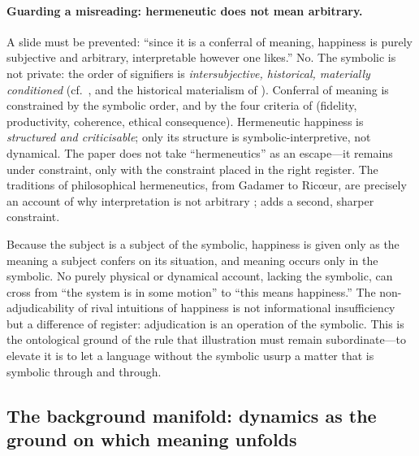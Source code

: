 \paragraph{Guarding a misreading: hermeneutic does not mean arbitrary.} A slide must be prevented: ``since it is a conferral of meaning, happiness is purely subjective and arbitrary, interpretable however one likes.'' No. The symbolic is not private: the order of signifiers is \emph{intersubjective, historical, materially conditioned} (cf.\ , and the historical materialism of ). Conferral of meaning is constrained by the symbolic order, and by the four criteria of  (fidelity, productivity, coherence, ethical consequence). Hermeneutic happiness is \emph{structured and criticisable}; only its structure is symbolic-interpretive, not dynamical. The paper does not take ``hermeneutics'' as an escape---it remains under constraint, only with the constraint placed in the right register. The traditions of philosophical hermeneutics, from Gadamer to Ricœur, are precisely an account of why interpretation is not arbitrary \parencite{gadamer2004,ricoeur1976};  adds a second, sharper constraint.

\begin{claim}
Because the subject is a subject of the symbolic, happiness is given only as the meaning a subject confers on its situation, and meaning occurs only in the symbolic. No purely physical or dynamical account, lacking the symbolic, can cross from ``the system is in some motion'' to ``this means happiness.'' The non-adjudicability of rival intuitions of happiness is not informational insufficiency but a difference of register: adjudication is an operation of the symbolic. This is the ontological ground of the rule that illustration must remain subordinate---to elevate it is to let a language without the symbolic usurp a matter that is symbolic through and through.
\end{claim}

\subsection{The background manifold: dynamics as the ground on which meaning unfolds}
\label{p19:sub:gen-manifold}

